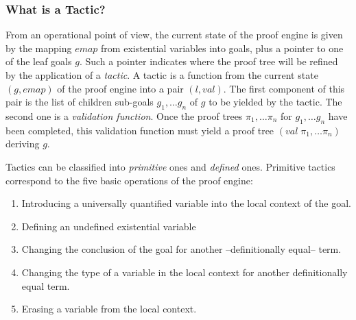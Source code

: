 \subsubsection[What is a Tactic?]{What is a Tactic?\label{WhatIsATactic}}

From an operational point of view, the current state of the proof
engine is given by the mapping $emap$ from existential variables into
goals, plus a pointer to one of the leaf goals $g$.  Such a pointer
indicates where the proof tree will be refined by the application of a
\textsl{tactic}. A tactic is a function from the current state
$(g,emap)$ of the proof engine into a pair $(l,val)$. The first
component of this pair is the list of children sub-goals $g_1,\ldots
g_n$ of $g$ to be yielded by the tactic. The second one is a
\textsl{validation function}. Once the proof trees $\pi_1,\ldots
\pi_n$ for $g_1,\ldots g_n$ have been completed, this validation
function must yield a proof tree $(val\;\pi_1,\ldots \pi_n)$ deriving
$g$.

Tactics can be classified into \textsl{primitive} ones and
\textsl{defined} ones. Primitive tactics correspond to the five basic
operations of the proof engine:

\begin{enumerate}
\item Introducing a universally quantified variable into the local
context of the goal.
\item Defining an undefined existential variable 
\item Changing the conclusion of the goal for another
--definitionally equal-- term.
\item Changing the type of a variable in the local context for another
definitionally equal term.
\item Erasing a variable from the local context.
\end{enumerate}

